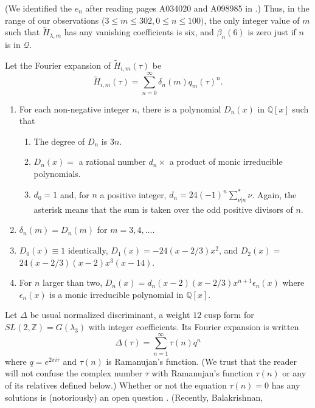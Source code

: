 \documentclass{article}
\begin{document}
\noindent
(We identified the $e_n$ after reading
pages A034020 and A098985 in \cite{OEIS}.)
\newline \newline \noindent
Thus, in the range of our observations
($3\leq m\leq 302, 0\leq n\leq 100)$,
the only integer value of $m$
such that
$\widetilde{H}_{\lambda,m}$ has any vanishing coefficients
is six, and $\beta_n(6)$ is zero just if
$n$ is in $\mathscr{Q}$. 
\begin{conjecture}
Let the Fourier expansion of $\widetilde{H}_{i,m}(\tau)$ be
$$
\widetilde{H}_{i,m}(\tau) =
\sum_{n=0}^{\infty} \delta_n(m) q_m(\tau)^n.
$$ 
\begin{enumerate}
\item For each non-negative integer $n$, 
there is a polynomial
$D_n(x)$ in $\mathbb{Q}[x]$ 
such that 
\begin{enumerate}
    \item The degree of $D_n$ is $3n$.
    \item $D_n(x) =$ a rational number 
    $d_n \times$ a product of 
    monic irreducible polynomials.
    \item $d_0 = 1$  and, for $n$ a positive
    integer, $d_n = 24(-1)^n  \sum^*_{\nu|n} \nu$.
    Again, the asterisk means that the
    sum is taken over the odd positive divisors of $n$.
\end{enumerate} 
\item  $\delta_n(m)=D_n(m)$  for  $m = 3,4, ....$
\item $D_0(x) \equiv 1$ identically,
$D_1(x)  = -24(x-2/3)x^2$, and
$D_2(x) = $ \newline $24(x-2/3)(x-2)x^3(x-14)$.
\item For $n$ larger than two,
$D_n(x) =d_n (x-2)(x-2/3)x^{n+1} \epsilon_n(x)$
where $\epsilon_n(x)$ is a monic irreducible
polynomial in  $\mathbb{Q}[x]$.
\end{enumerate}
\end{conjecture}
\noindent
Let $\Delta$ be usual normalized discriminant,
 a weight $12$ cusp form
for $SL(2,\mathbb{Z}) =  G(\lambda_3)$
with integer coefficients.
Its Fourier expansion is written
$$
\Delta(\tau) = \sum_{n=1}^{\infty} \tau(n) q^n
$$
where $q = e^{2 \pi i \tau}$ and
 $\tau(n)$ is Ramanujan's function. 
 (We trust that the reader will not 
 confuse the complex number $\tau$
 with Ramanujan's function $\tau(n)$
 or any of its relatives defined below.)
Whether or not
the equation $\tau(n) = 0$ has 
any solutions is (notoriously) an open
question \cite{lehmer1947vanishing}.
(Recently, Balakrishnan, 
\end{document}
